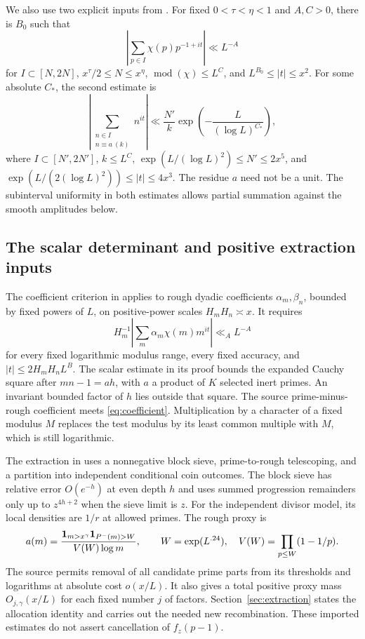 We also use two explicit inputs from \cite[Appendix A]{D}.
For fixed $0<\tau<\eta<1$ and $A,C>0$, there is $B_0$ such that
\begin{equation}\label{eq:longprime}
 \left|\sum_{p\in I}\chi(p)p^{-1+it}\right|\ll L^{-A}
\end{equation}
for $I\subset[N,2N]$, $x^\tau/2\leq N\leq x^\eta$,
$\operatorname{mod}(\chi)\leq L^C$, and $L^{B_0}\leq|t|\leq x^2$.
For some absolute $C_*$, the second estimate is
\begin{equation}\label{eq:logphase}
 \left|\sum_{\substack{n\in I\\n\equiv a\ (k)}}n^{it}\right|
 \ll\frac{N'}k\exp\left(-\frac{L}{(\log L)^{C_*}}\right),
\end{equation}
where $I\subset[N',2N']$, $k\leq L^C$,
$\exp(L/(\log L)^2)\leq N'\leq2x^5$, and
$\exp(L/(2(\log L)^2))\leq|t|\leq4x^3$.
The residue $a$ need not be a unit. The subinterval uniformity in both
estimates allows partial summation against the smooth amplitudes below.

\subsection{The scalar determinant and positive extraction inputs}

The coefficient criterion in \cite[Section 8]{P} applies to rough
dyadic coefficients $\alpha_m,\beta_n$, bounded by fixed powers of $L$,
on positive-power scales $H_mH_n\asymp x$. It requires
\begin{equation}\label{eq:coefficient}
 H_m^{-1}\left|\sum_m\alpha_m\chi(m)m^{it}\right|\ll_A L^{-A}
\end{equation}
for every fixed logarithmic modulus range, every fixed accuracy, and
$|t|\leq2H_mH_nL^B$. The scalar estimate in its proof bounds the
expanded Cauchy square after $mn-1=ah$, with $a$ a product of $K$
selected inert primes. An invariant bounded factor of $h$ lies outside
that square. The source prime-minus-rough coefficient meets
\eqref{eq:coefficient}. Multiplication by a character of a fixed
modulus $M$ replaces the test modulus by its least common multiple
with $M$, which is still logarithmic.

The extraction in \cite[Section 7]{D} uses a nonnegative block sieve,
prime-to-rough telescoping, and a partition into independent conditional
coin outcomes. The block sieve has relative error $O(e^{-h})$ at even
depth $h$ and uses summed progression remainders only up to
$z^{4h+2}$ when the sieve limit is $z$. For the independent divisor
model, its local densities are $1/r$ at allowed primes.
The rough proxy is
\[
 a(m)=\frac{\mathbf 1_{m>x^\gamma}\mathbf 1_{P^-(m)>W}}{V(W)\log m},
 \qquad W=\exp(L^{.24}),\quad V(W)=\prod_{p\leq W}(1-1/p).
\]
The source permits removal of all candidate prime parts from its
thresholds and logarithms at absolute cost $o(x/L)$. It also gives a
total positive proxy mass $O_{j,\gamma}(x/L)$ for each fixed number
$j$ of factors. Section~\ref{sec:extraction} states the allocation
identity and carries out the needed new recombination.
These imported estimates do not assert cancellation of $f_z(p-1)$.
